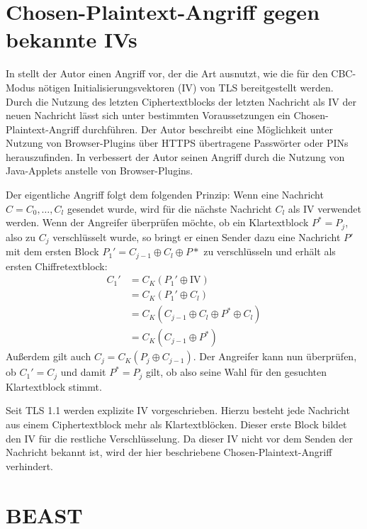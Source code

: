 \section{Chosen-Plaintext-Angriff gegen bekannte IVs}

\label{sec_known_ivs}

In \cite{bard04} stellt der Autor einen Angriff vor, der die Art ausnutzt, wie die für den CBC-Modus nötigen Initialisierungsvektoren (IV) von TLS bereitgestellt werden. Durch die Nutzung des letzten Ciphertextblocks der letzten Nachricht als IV der neuen Nachricht lässt sich unter bestimmten Voraussetzungen ein Chosen-Plaintext-Angriff durchführen. Der Autor beschreibt eine Möglichkeit unter Nutzung von Browser-Plugins über HTTPS übertragene Passwörter oder PINs herauszufinden. In \cite{bard06} verbessert der Autor seinen Angriff durch die Nutzung von Java-Applets anstelle von Browser-Plugins.

Der eigentliche Angriff folgt dem folgenden Prinzip: Wenn eine Nachricht \(C = C_0,\dots,C_l\) gesendet wurde, wird für die nächste Nachricht \(C_l\) als IV verwendet werden. Wenn der Angreifer überprüfen möchte, ob ein Klartextblock \(P^*=P_j\), also zu \(C_j\) verschlüsselt wurde, so bringt er einen Sender dazu eine Nachricht \(P'\) mit dem ersten Block \(P_1'=C_{j-1} \oplus C_l \oplus P*\) zu verschlüsseln und erhält als ersten Chiffretextblock:
\begin{align*}
C_1' &= C_{K}(P_1' \oplus \text{IV})\\
	&= C_{K}(P_1' \oplus C_l)\\
	&= C_{K}(C_{j-1} \oplus C_l \oplus P^* \oplus C_l)\\
	&= C_{K}(C_{j-1} \oplus P^*)
\end{align*}
Außerdem gilt auch \(C_j= C_{K}(P_j \oplus C_{j-1})\). Der Angreifer kann nun überprüfen, ob \(C_1'=C_j\) und damit \(P^*=P_j\) gilt, ob also seine Wahl für den gesuchten Klartextblock stimmt.

Seit TLS 1.1 werden explizite IV vorgeschrieben. Hierzu besteht jede Nachricht aus einem Ciphertextblock mehr als Klartextblöcken. Dieser erste Block bildet den IV für die restliche Verschlüsselung. Da dieser IV nicht vor dem Senden der Nachricht bekannt ist, wird der hier beschriebene Chosen-Plaintext-Angriff verhindert.

\section{BEAST}


